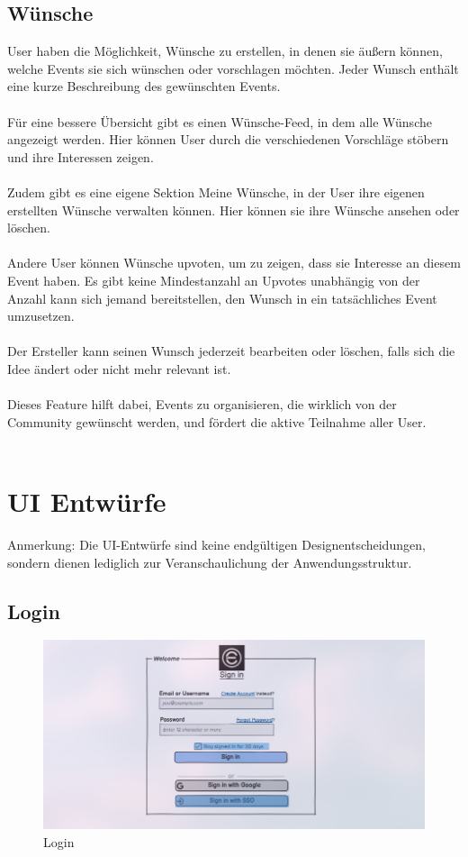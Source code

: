 \documentclass[a4paper,12pt]{article}
\begin{document}
\subsection{Wünsche}
User haben die Möglichkeit, Wünsche zu erstellen, in denen sie äußern können, welche Events sie sich wünschen oder vorschlagen möchten. Jeder Wunsch enthält eine kurze Beschreibung des gewünschten Events.\\\\
Für eine bessere Übersicht gibt es einen Wünsche-Feed, in dem alle Wünsche angezeigt werden. Hier können User durch die verschiedenen Vorschläge stöbern und ihre Interessen zeigen.\\\\
Zudem gibt es eine eigene Sektion Meine Wünsche, in der User ihre eigenen erstellten Wünsche verwalten können. Hier können sie ihre Wünsche ansehen oder löschen.\\\\
Andere User können Wünsche upvoten, um zu zeigen, dass sie Interesse an diesem Event haben. Es gibt keine Mindestanzahl an Upvotes unabhängig von der Anzahl kann sich jemand bereitstellen, den Wunsch in ein tatsächliches Event umzusetzen.\\\\
Der Ersteller kann seinen Wunsch jederzeit bearbeiten oder löschen, falls sich die Idee ändert oder nicht mehr relevant ist.\\\\  
Dieses Feature hilft dabei, Events zu organisieren, die wirklich von der Community gewünscht werden, und fördert die aktive Teilnahme aller User.\\\\
\newpage
\section{UI Entwürfe}
Anmerkung: Die UI-Entwürfe sind keine endgültigen Designentscheidungen, sondern dienen lediglich zur Veranschaulichung der Anwendungsstruktur.
\subsection{Login}
\begin{figure}[H]
    \centering
    \includegraphics[width=1\textwidth]{Abbildungen/events/login.png}
    \caption{Login}
    \label{fig:login}
  \end{figure}
\end{document}
